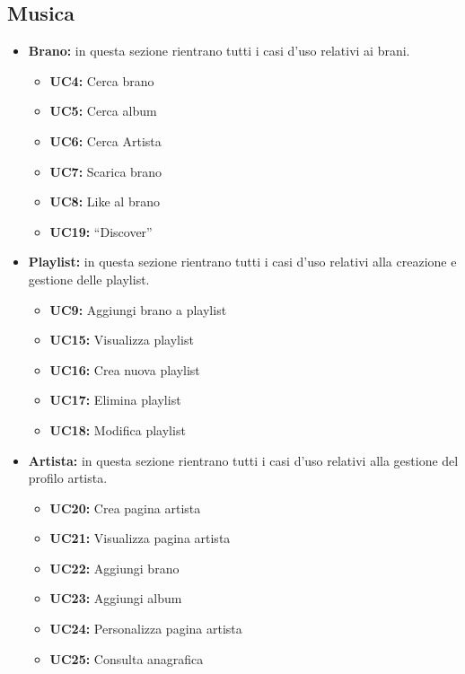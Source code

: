\subsection{Musica}
\begin{itemize}
    \item \textbf{Brano:} in questa sezione rientrano tutti i casi d'uso relativi ai brani.
    \begin{itemize}
        \item \textbf{UC4:} Cerca brano
        \item \textbf{UC5:} Cerca album
        \item \textbf{UC6:} Cerca Artista
        \item \textbf{UC7:} Scarica brano
        \item \textbf{UC8:} Like al brano
        \item \textbf{UC19:} ``Discover'' 
    \end{itemize} 
    
    \item \textbf{Playlist:} in questa sezione rientrano tutti i casi d'uso relativi alla creazione e gestione delle playlist.
    \begin{itemize}
        \item \textbf{UC9:} Aggiungi brano a playlist
        \item \textbf{UC15:} Visualizza playlist 
        \item \textbf{UC16:} Crea nuova playlist 
        \item \textbf{UC17:} Elimina playlist
        \item \textbf{UC18:} Modifica playlist
    \end{itemize}
    
    \item \textbf{Artista:} in questa sezione rientrano tutti i casi d'uso relativi alla gestione del profilo artista.
    \begin{itemize}
        \item  \textbf{UC20:} Crea pagina artista 
        \item  \textbf{UC21:} Visualizza pagina artista 
        \item  \textbf{UC22:} Aggiungi brano 
        \item  \textbf{UC23:} Aggiungi album 
        \item  \textbf{UC24:} Personalizza pagina artista 
        \item  \textbf{UC25:} Consulta anagrafica
    \end{itemize} 
\end{itemize}

